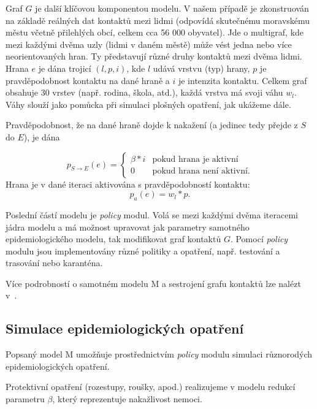 Graf $G$ je další klíčovou komponentou modelu. V našem případě je
zkonstruován na základě reálných dat kontaktů mezi lidmi (odpovídá
skutečnému moravskému městu včetně přilehlých obcí, celkem cca 56 000
obyvatel). Jde o multigraf, kde mezi každými dvěma uzly (lidmi v daném
městě) může vést jedna nebo více neorientovaných hran.  Ty představují
různé druhy kontaktů mezi dvěma lidmi.  Hrana $e$ je dána trojicí $(l,
p, i)$, kde $l$ udává vrstvu (typ) hrany, $p$ je pravděpodobnost
kontaktu na dané hraně a $i$ je intenzita kontaktu. Celkem graf
obsahuje 30 vrstev (např. rodina, škola, atd.), každá vrstva má svoji
váhu $w_l$. Váhy slouží jako pomůcka při simulaci plošných opatření,
jak ukážeme dále.

Pravděpodobnost, že na dané hraně dojde k nakažení (a jedinec tedy přejde z $S$
do $E$), je dána

\begin{equation}
  p_{S \rightarrow E}(e) = \begin{cases}
    \beta * i  & \mbox{pokud hrana je aktivní} \\
    0          & \mbox{pokud hrana není aktivní.} 
    \end{cases}
\end{equation}
Hrana je v dané iteraci aktivována s pravděpodobností kontaktu:
\begin{equation}
\label{pg:eq:w}
p_a(e) = w_l * p.
\end{equation}

Poslední částí modelu je {\em policy} modul. Volá se mezi každými dvěma
iteracemi jádra modelu a má možnost upravovat jak parametry samotného
epidemiologického modelu, tak modifikovat graf kontaktů $G$. Pomocí {\em policy} modulu
jsou implementovány různé politiky a opatření, např. testování a
trasování nebo karanténa. 

Více podrobností o samotném modelu M a sestrojení grafu kontaktů lze nalézt v~\cite{pg:modelM}.

\subsection*{Simulace epidemiologických  opatření}

Popsaný model M umožňuje prostřednictvím {\em policy} modulu simulaci
různorodých epidemiologických opatření.

Protektivní opatření (rozestupy, roušky, apod.) realizujeme v modelu
redukcí parametru $\beta$, který reprezentuje nakažlivost nemoci.

